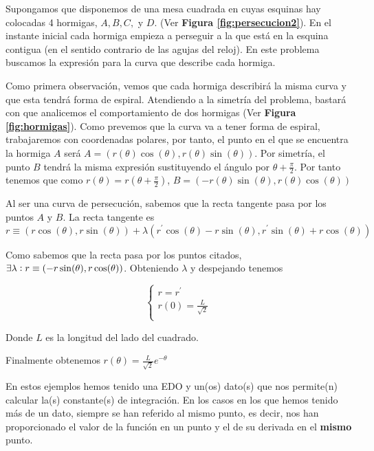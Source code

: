 \begin{example}
Supongamos que disponemos de una mesa cuadrada en cuyas esquinas hay colocadas 4 hormigas, $A, B, C,$ y $D$. (Ver \textbf{Figura \ref{fig:persecucion2}}). En el instante inicial cada hormiga empieza a perseguir a la que está en la esquina contigua (en el sentido contrario de las agujas del reloj). En este problema buscamos la expresión para la curva que describe cada hormiga.

Como primera observación, vemos que cada hormiga describirá la misma curva y que esta tendrá forma de espiral. Atendiendo a la simetría del problema, bastará con que analicemos el comportamiento de dos hormigas (Ver \textbf{Figura \ref{fig:hormigas}}). Como prevemos que la curva va a tener forma de espiral, trabajaremos con coordenadas polares, por tanto, el punto en el que se encuentra la hormiga $A$ será $A=(r(\theta)\cos(\theta), r(\theta)\sin(\theta))$. Por simetría, el punto $B$ tendrá la misma expresión sustituyendo el ángulo por $\theta+\frac{\pi}{2}$. Por tanto tenemos que como $r(\theta)=r(\theta+\frac{\pi}{2})$, $B=(-r(\theta)\sin(\theta), r(\theta)\cos(\theta))$

Al ser una curva de persecución, sabemos que la recta tangente pasa por los puntos $A$ y $B$. La recta tangente es $r\equiv (r\cos(\theta), r\sin(\theta))+\lambda(r^\prime \cos(\theta)-r\sin(\theta),r^\prime \sin(\theta)+r\cos(\theta))$

Como sabemos que la recta pasa por los puntos citados, $\exists \lambda : r\equiv (-r\sin(\theta), r\cos(\theta))$. Obteniendo $\lambda$ y despejando tenemos 

\begin{equation*}
  \left\lbrace
  \begin{array}{l}
     r = r^\prime \\
     r(0) = \frac{L}{\sqrt{2}}  \\
  \end{array}
  \right.
\end{equation*}

Donde $L$ es la longitud del lado del cuadrado.

Finalmente obtenemos $r(\theta) = \frac{L}{\sqrt{2}}e^{-\theta}$

\end{example}

En estos ejemplos hemos tenido una EDO y un(os) dato(s) que nos permite(n) calcular la(s) constante(s) de integración. En los casos en los que hemos tenido más de un dato, siempre se han referido al mismo punto, es decir, nos han proporcionado el valor de la función en un punto y el de su derivada en el \textbf{mismo} punto.

